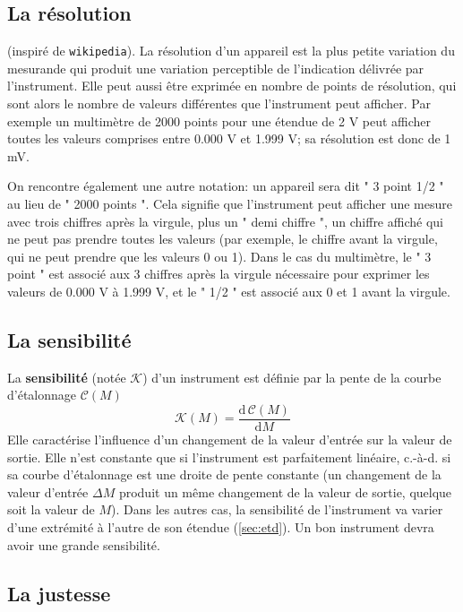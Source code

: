 \subsection{La résolution}

(inspiré de \texttt{wikipedia}). La résolution d'un appareil est la plus petite variation du mesurande qui produit une variation perceptible de l'indication délivrée par l'instrument. Elle peut aussi être exprimée en nombre de points de résolution, qui sont alors le nombre de valeurs différentes que l'instrument peut afficher. Par exemple un multimètre de 2000 points pour une étendue de 2 V peut afficher toutes les valeurs comprises entre 0.000 V et 1.999 V; sa résolution est donc de 1 mV.

On rencontre également une autre notation: un appareil sera dit " 3 point 1/2 " au lieu de " 2000 points ". Cela signifie que l'instrument peut afficher une mesure avec trois chiffres après la virgule, plus un " demi chiffre ", un chiffre affiché qui ne peut pas prendre toutes les valeurs (par exemple, le chiffre avant la virgule, qui ne peut prendre que les valeurs 0 ou 1). Dans le cas du multimètre, le " 3 point " est associé aux 3 chiffres après la virgule nécessaire pour exprimer les valeurs de 0.000 V à 1.999 V, et le " 1/2 " est associé aux 0 et 1 avant la virgule.

\subsection{La sensibilité}

La \textbf{sensibilité} (notée $\mathcal{K}$) d'un instrument est définie par la pente de la courbe d'étalonnage $\mathcal{C}(M)$
$$
\mathcal{K}(M)=\frac{\text{d}\,\mathcal{C}(M)}{\text{d}M}
$$
Elle caractérise l'influence d'un changement de la valeur d'entrée sur la valeur de sortie. Elle n'est constante que si l'instrument est parfaitement linéaire, c.-à-d. si sa courbe d'étalonnage est une droite de pente constante (un changement de la valeur d'entrée $\Delta M$ produit un même changement de la valeur de sortie, quelque soit la valeur de $M$). Dans les autres cas, la sensibilité de l'instrument va varier d'une extrémité à l'autre de son étendue (\ref{sec:etd}). Un bon instrument devra avoir une grande sensibilité.

\subsection{La justesse}


